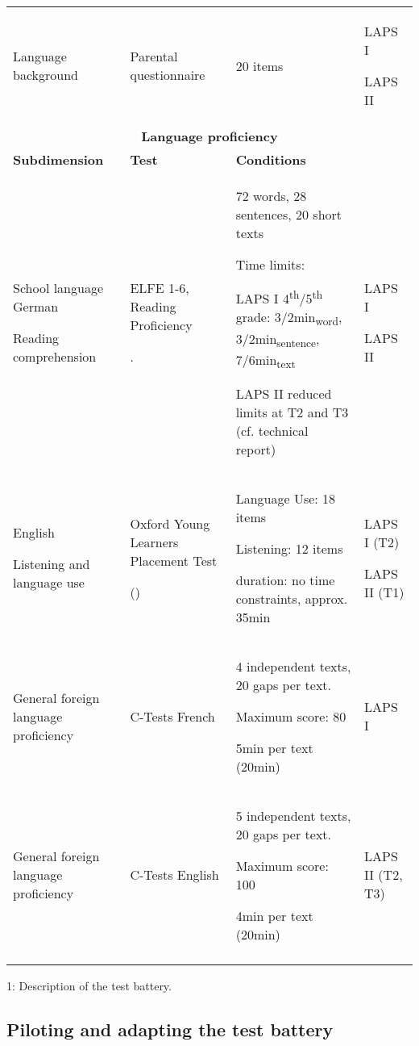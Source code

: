 \documentclass[output=paper]{langsci/langscibook}
\begin{document}
\begin{tabularx}{\textwidth}{XXXX}
Language background & Parental questionnaire & 20 items & LAPS I

LAPS II\\
\multicolumn{4}{c}{{\bfseries Language proficiency}}\\
{\bfseries Subdimension} & {\bfseries Test} & {\bfseries Conditions} & \\
School language German

Reading comprehension & ELFE 1-6, Reading Proficiency

\citealt{LenhardSchneider2006}. & 72 words, 28 sentences, 20 short texts

Time limits:

LAPS I 4\textsuperscript{th}/5\textsuperscript{th} grade: 3/2min\textsubscript{word}, 3/2min\textsubscript{sentence}, 7/6min\textsubscript{text}

LAPS II reduced limits at T2 and T3 (cf. technical report) & LAPS I

LAPS II\\
English 

Listening and language use & Oxford Young Learners Placement Test

(\citealt{Testing2013}) & Language Use: 18 items

Listening: 12 items

duration: no time constraints, approx. 35min & LAPS I (T2)

LAPS II (T1)\\
General foreign language proficiency & C-Tests French & 4 independent texts, 20 gaps per text.

Maximum score: 80

5min per text (20min) & LAPS I\\
General foreign language proficiency & C-Tests English & 5 independent texts, 20 gaps per text.

Maximum score: 100

4min per text (20min) & LAPS II (T2, T3)\\
\lspbottomrule
\end{tabularx}
\begin{table}
\caption{1: Description of the test battery.}
\label{tab:02:2}
\end{table}

\subsection{Piloting and adapting the test battery}
\end{document}
